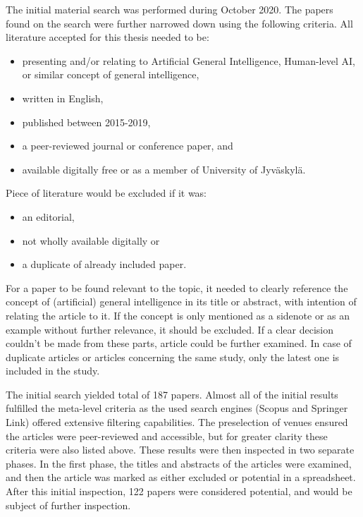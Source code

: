 \documentclass[utf8,english]{gradu3}
\begin{document}
The initial material search was performed during October 2020. The papers found
on the search were further narrowed down using the following criteria. All
literature accepted for this thesis needed to be:

\begin{itemize}
  \item presenting and/or relating to Artificial General Intelligence,
        Human-level AI, or similar concept of general intelligence,
  \item written in English,
  \item published between 2015-2019,
  \item a peer-reviewed journal or conference paper, and
  \item available digitally free or as a member of University of Jyväskylä.
\end{itemize}

Piece of literature would be excluded if it was:

\begin{itemize}
  \item an editorial,
  \item not wholly available digitally or
  \item a duplicate of already included paper.
\end{itemize}

For a paper to be found relevant to the topic, it needed to clearly reference
the concept of (artificial) general intelligence in its title or abstract, with
intention of relating the article to it. If the concept is only mentioned as a
sidenote or as an example without further relevance, it should be excluded. If a
clear decision couldn't be made from these parts, article could be further
examined. In case of duplicate articles or articles concerning the same study,
only the latest one is included in the study.

The initial search yielded total of 187 papers. Almost all of the initial
results fulfilled the meta-level criteria as the used search engines (Scopus and
Springer Link) offered extensive filtering capabilities. The preselection of
venues ensured the articles were peer-reviewed and accessible, but for greater
clarity these criteria were also listed above. These results were then inspected
in two separate phases. In the first phase, the titles and abstracts of the
articles were examined, and then the article was marked as either excluded or
potential in a spreadsheet. After this initial inspection, 122 papers were
considered potential, and would be subject of further inspection.
\end{document}
